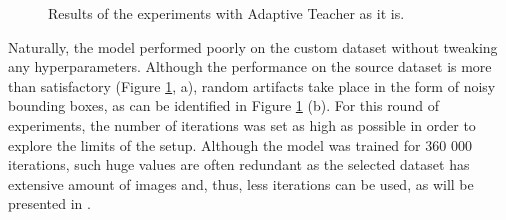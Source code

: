 \begin{figure}[htb]
    \centering
    \qquad
    \caption{Results of the experiments with Adaptive Teacher as it is.}\label{adapt_experiment1}%
\end{figure}

Naturally, the model performed poorly on the custom dataset without tweaking any hyperparameters. Although the performance on the source dataset is more than satisfactory (Figure \ref{adapt_experiment1}, a), random artifacts take place in the form of noisy bounding boxes, as can be identified in Figure \ref{adapt_experiment1} (b). For this round of experiments, the number of iterations was set as high as possible in order to explore the limits of the setup. Although the model was trained for 360 000 iterations, such huge values are often redundant as the selected dataset has extensive amount of images and, thus, less iterations can be used, as will be presented in . 

